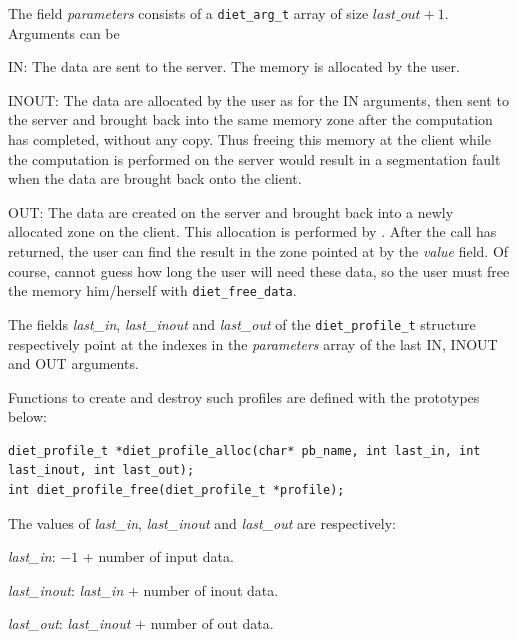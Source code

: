 The field \emph{parameters} consists of a \texttt{diet\_arg\_t} array of size
$last\_out + 1$. Arguments can be
\begin{description}
\item{IN:}    The data are sent to the server. The memory is allocated
  by the user.
\item{INOUT:} The data are allocated by the user as for the IN
  arguments, then sent to the server and brought back into the same memory zone
  after the computation has completed, without any copy. Thus freeing this
  memory at the client while the computation is performed on the
  server would result in a segmentation fault when the data are
  brought back onto the client.
\item{OUT:} The data are created on the server and brought back into a
  newly allocated zone on the client. This allocation is performed by
  \diet. After the call has returned, the user can find the result in
  the zone pointed at by the \emph{value} field. Of course, \diet
  cannot guess how long the user will need these data, so the
  user must free the memory him/herself with \texttt{diet\_free\_data}.
\end{description}


The fields \emph{last\_in}, \emph{last\_inout} and \emph{last\_out} of the
\texttt{diet\_profile\_t} structure respectively point at the indexes in the
\emph{parameters} array of the last IN, INOUT and OUT arguments. 

Functions to create and destroy such profiles are defined with the prototypes
below: \\
{\footnotesize
\begin{verbatim}
diet_profile_t *diet_profile_alloc(char* pb_name, int last_in, int last_inout, int last_out);
int diet_profile_free(diet_profile_t *profile);
\end{verbatim}
}

The values of \emph{last\_in}, \emph{last\_inout} and \emph{last\_out}
are respectively:
\begin{description}
\item{\emph{last\_in}:} $-1$ + number of input data.

\item{\emph{last\_inout}:} \emph{last\_in} $+$ number of inout data.

\item{\emph{last\_out}:} \emph{last\_inout} $+$ number of out data.
\end{description}

